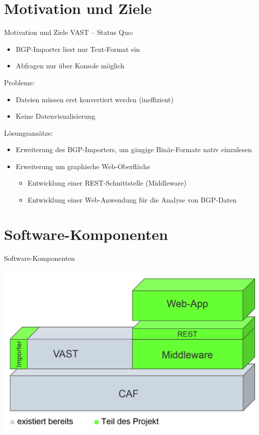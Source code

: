 \documentclass[9pt]{beamer}
\begin{document}
\section{Motivation und Ziele}

\begin{frame}{Motivation und Ziele}{}
   VAST -- Status Quo:
	\begin{itemize}
		\item BGP-Importer liest nur Text-Format ein
		\item Abfragen nur über Konsole möglich
		\end{itemize}
		\vspace{0,2cm}		
	Probleme:
		\begin{itemize}
		\item Dateien müssen erst konvertiert werden (ineffizient)
		\item Keine Datenvisualisierung
		\end{itemize}
		\vspace{0,2cm}
	Lösungsansätze:
		\begin{itemize}
			\item Erweiterung des BGP-Importers, um gängige Binär-Formate nativ 
			         einzulesen
			\item Erweiterung um graphische Web-Oberfläche
			\vspace{0,1cm}
		\begin{itemize}
			\item Entwicklung einer REST-Schnittstelle (Middleware)
			\item Entwicklung einer Web-Anwendung für die Analyse von BGP-Daten
		\end{itemize}
		\end{itemize}
\end{frame}

\section{Software-Komponenten}

\begin{frame}{Software-Komponenten}{}
	\begin{center}
		\includegraphics[width=1.0\textwidth]{res/software-komponenten.png}
	\end{center}
\end{frame}
\end{document}
